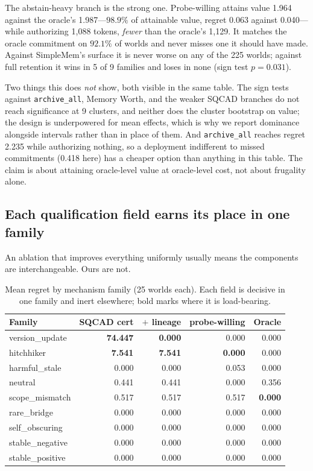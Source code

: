 \documentclass{article}
\newcommand{\SQCAD}{\textsc{SQCAD}}
\begin{document}
The abstain-heavy branch is the strong one. Probe-willing attains value 1.964
against the oracle's 1.987---$98.9\%$ of attainable value, regret 0.063 against
0.040---while authorizing 1{,}088 tokens, \emph{fewer} than the oracle's 1{,}129.
It matches the oracle commitment on $92.1\%$ of worlds and never misses one it
should have made. Against SimpleMem's surface it is never worse on any of the 225
worlds; against full retention it wins in 5 of 9 families and loses in none (sign
test $p=0.031$).

Two things this does \emph{not} show, both visible in the same table. The sign
tests against \texttt{archive\_all}, Memory Worth, and the weaker \SQCAD{} branches
do not reach significance at 9 clusters, and neither does the cluster bootstrap on
value; the design is underpowered for mean effects, which is why we report
dominance alongside intervals rather than in place of them. And
\texttt{archive\_all} reaches regret 2.235 while authorizing nothing, so a
deployment indifferent to missed commitments (0.418 here) has a cheaper option than
anything in this table. The claim is about attaining oracle-level value at
oracle-level cost, not about frugality alone.

\subsection{Each qualification field earns its place in one family}
An ablation that improves everything uniformly usually means the components are
interchangeable. Ours are not.

\begin{table}[t]
\caption{Mean regret by mechanism family (25 worlds each). Each field is decisive in
one family and inert elsewhere; bold marks where it is load-bearing.}
\label{tab:family}
\centering\small
\begin{tabular}{lrrrr}
\toprule
Family & \SQCAD{} cert & $+$ lineage & probe-willing & Oracle \\
\midrule
version\_update  & \textbf{74.447} & \textbf{0.000} & 0.000 & 0.000 \\
hitchhiker       & \textbf{7.541} & \textbf{7.541} & \textbf{0.000} & 0.000 \\
harmful\_stale   & 0.000 & 0.000 & 0.053 & 0.000 \\
neutral          & 0.441 & 0.441 & 0.000 & 0.356 \\
scope\_mismatch  & 0.517 & 0.517 & 0.517 & \textbf{0.000} \\
rare\_bridge     & 0.000 & 0.000 & 0.000 & 0.000 \\
self\_obscuring  & 0.000 & 0.000 & 0.000 & 0.000 \\
stable\_negative & 0.000 & 0.000 & 0.000 & 0.000 \\
stable\_positive & 0.000 & 0.000 & 0.000 & 0.000 \\
\bottomrule
\end{tabular}
\end{table}
\end{document}
